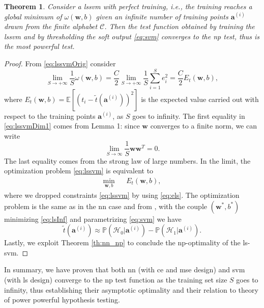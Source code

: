 \documentclass[draftcls,onecolumn,12pt]{IEEEtran}
\newcommand{\ie}{i.e., }
\newcommand{\wrt}{with respect to }
\newcommand{\Exp}[1]{\mathbb{E}\left[#1\right]}
\newcommand{\E}{E}
\newtheorem{theorem}{Theorem}
\begin{document}
\begin{theorem}
	\label{th:lsnp}
	Consider a \ac{lssvm} with perfect training, \ie the training reaches a global minimum of $\omega(\bm{w},b)$ given an infinite number of training points $\bm{a}^{(i)}$ drawn from the finite alphabet $\mathcal C$. Then the test function obtained by training the \ac{lssvm} and by thresholding the soft output \eqref{eq:svm} converges to  the \ac{np} test, thus is the most powerful test.
\end{theorem}
\begin{proof}
	From \eqref{eq:lssvmOrig} consider
	\begin{equation}
	\label{eq:lssvmDim1}
	\lim_{S \to +\infty} \frac{1}{S} \omega(\bm{w},b) =\frac{C}{2} \lim_{S \to +\infty}\frac{1}{S}  \sum_{i=1}^S e^2_i	=\frac{C}{2}\E_t(\bm{w},b),
	\end{equation}
	where $\E_t(\bm{w},b) = \Exp{\left(t_i - \tilde{t}(\bm{a}^{(i)})\right)^2} $ is the expected value carried out \wrt the training points $\bm{a}^{(i)}$, as $S$ goes to infinity. 	The first equality in \eqref{eq:lssvmDim1} comes from Lemma 1: since $\bm{w}$ converges to a finite norm, we can write
	\begin{equation}
	\lim_{S\to \infty} \frac{1}{S} \bm{w} \bm{w}^T 	= 0.
	\end{equation} 
	The last equality comes from the strong law of large numbers. In the limit, the optimization problem \eqref{eq:lssvm} is equivalent to
	\begin{equation}
	\label{eq:lsInf}
	\begin{aligned}
	& \underset{\bm{w},b}{\text{min}} & &  \E_t(\bm{w},b), & 
	\end{aligned}	
	\end{equation}
	where we dropped constraints  \eqref{eq:lssvm} by using \eqref{eq:els}. The optimization problem is the same as in the \ac{nn} case and from \cite{Ruck-90}, with the couple $(\bm{w}^*,b^*)$ minimizing \eqref{eq:lsInf} and parametrizing \eqref{eq:svm} we have
	\begin{equation}
	\tilde{t}(\bm{a}^{(i)})  \approx \mathbb{P}(\mathcal{H}_0|\bm{a}^{(i)}) - \mathbb{P}(\mathcal{H}_1|\bm{a}^{(i)}).
	\end{equation}
	Lastly, we exploit Theorem \ref{th:nn_np} to conclude the \ac{np}-optimality of the \ac{ls}-\ac{svm}.
\end{proof}

In summary, we have proven that both \ac{nn} (with \ac{ce} and \ac{mse} design) and \ac{svm} (with \ac{ls} design) converge to the \ac{np} test function as the training set size $S$ goes to infinity, thus establishing their asymptotic optimality and their relation to theory of power powerful hypothesis testing. 
\end{document}
